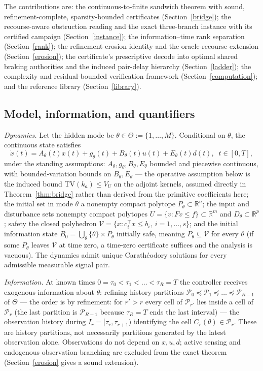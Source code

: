 \documentclass[10pt,twocolumn]{article}
\theoremstyle{plain}
\theoremstyle{definition}
\theoremstyle{remark}
\begin{document}
The contributions are: the continuous-to-finite sandwich theorem with sound,
refinement-complete, sparsity-bounded certificates (Section~\ref{bridge});
the recourse-aware obstruction reading and the exact three-branch instance
with its certified campaign (Section~\ref{instance}); the
information--time rank separation (Section~\ref{rank}); the refinement-erosion
identity and the oracle-recourse extension (Section~\ref{erosion}); the
certificate's prescriptive decode into optimal shared braking authorities
and the induced pair-delay hierarchy (Section~\ref{ladder}); the
complexity and residual-bounded verification framework
(Section~\ref{computation}); and the reference library
(Section~\ref{library}).

\subsection{Model, information, and quantifiers}\label{model}

\emph{Dynamics.} Let the hidden mode be
\(\theta \in \Theta := \{1,\dots,M\}\). Conditional on \(\theta\), the
continuous state satisfies
\[
\dot x(t) = A_\theta(t)x(t) + g_\theta(t) + B_\theta(t)u(t) + E_\theta(t)d(t),
\;\; t \in [0,T],
\]
under the standing assumptions: \(A_\theta, g_\theta, B_\theta, E_\theta\)
bounded and piecewise continuous, with bounded-variation bounds on
\(B_\theta, E_\theta\) --- the operative assumption below is the induced
bound \(\mathrm{TV}(k_a) \le V_U\) on the adjoint kernels, assumed
directly in Theorem~\ref{thm:bridge} rather than derived from the
primitive coefficients here; the initial set in mode \(\theta\) a nonempty compact
polytope \(P_\theta \subset \mathbb{R}^n\); the input and disturbance sets
nonempty compact polytopes \(U = \{v : Fv \le f\} \subset \mathbb{R}^m\) and
\(D_\theta \subset \mathbb{R}^p\); safety the closed polyhedron
\(\mathcal{V} = \{x : c_i^\top x \le b_i,\ i = 1,\dots,s\}\); and the initial
information state
\(B_0 = \bigcup_{\theta} \{\theta\} \times P_\theta\) initially safe,
meaning \(P_\theta \subseteq \mathcal{V}\) for every \(\theta\) (if some
\(P_\theta\) leaves \(\mathcal{V}\) at time zero, a time-zero certificate
suffices and the analysis is vacuous). The dynamics admit unique
Carath\'eodory solutions for every admissible measurable signal pair.

\emph{Information.} At known times
\(0 = \tau_0 < \tau_1 < \dots < \tau_R = T\) the controller receives
exogenous information about \(\theta\): refining history partitions
\(\mathcal{P}_0 \preceq \mathcal{P}_1 \preceq \dots \preceq \mathcal{P}_{R-1}\)
of \(\Theta\) --- the order is by refinement: for \(r' > r\) every cell of
\(\mathcal{P}_{r'}\) lies inside a cell of \(\mathcal{P}_r\) (the last
partition is \(\mathcal{P}_{R-1}\) because \(\tau_R = T\) ends the last
interval) --- the observation history during
\(I_r = [\tau_r, \tau_{r+1})\) identifying the cell \(C_r(\theta) \in
\mathcal{P}_r\). These are history partitions, not necessarily partitions
generated by the latest observation alone. Observations do not depend on
\(x, u, d\); active sensing and endogenous observation branching are excluded
from the exact theorem (Section~\ref{erosion} gives a sound extension).
\end{document}
